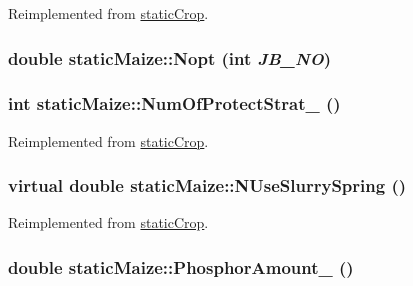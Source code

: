 Reimplemented from \hyperlink{classstatic_crop_a32b69ed138beaed150efa74d18e82d8e}{staticCrop}.\hypertarget{classstatic_maize_a8ec3a9f8b30656d537fa8b44a8905be7}{
\subsubsection[{Nopt}]{\setlength{\rightskip}{0pt plus 5cm}double staticMaize::Nopt (int {\em JB\_\-NO})}}
\label{classstatic_maize_a8ec3a9f8b30656d537fa8b44a8905be7}
\hypertarget{classstatic_maize_afc493353ee7d925a708506e8738eea5f}{
\subsubsection[{NumOfProtectStrat\_\-}]{\setlength{\rightskip}{0pt plus 5cm}int staticMaize::NumOfProtectStrat\_\- ()}}
\label{classstatic_maize_afc493353ee7d925a708506e8738eea5f}


Reimplemented from \hyperlink{classstatic_crop_a4d3d767f569f48eb68ffa76822302467}{staticCrop}.\hypertarget{classstatic_maize_a4054559a82f50ce5bb73091de2aed6f6}{
\subsubsection[{NUseSlurrySpring}]{\setlength{\rightskip}{0pt plus 5cm}virtual double staticMaize::NUseSlurrySpring ()}}
\label{classstatic_maize_a4054559a82f50ce5bb73091de2aed6f6}


Reimplemented from \hyperlink{classstatic_crop_ae7d21ab4afc8d8355d231566e8d87b1b}{staticCrop}.\hypertarget{classstatic_maize_a521e65129a55f99bc810e26bdf7041ce}{
\subsubsection[{PhosphorAmount\_\-}]{\setlength{\rightskip}{0pt plus 5cm}double staticMaize::PhosphorAmount\_\- ()}}
\label{classstatic_maize_a521e65129a55f99bc810e26bdf7041ce}


